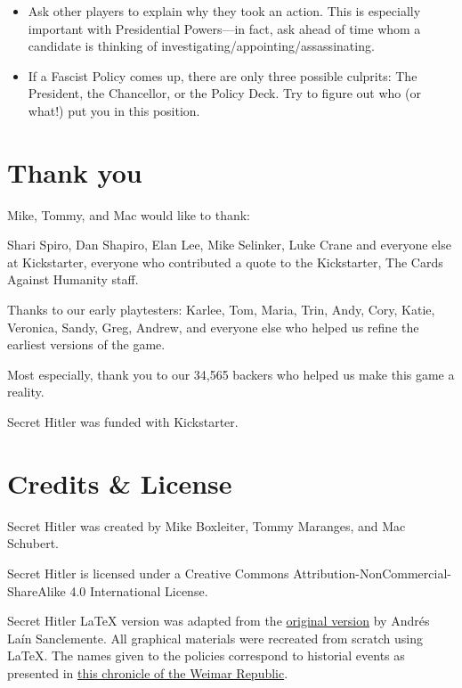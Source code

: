 \documentclass[13pt,a4paper,twocolumn,titlepage]{scrartcl}
\begin{document}
\begin{itemize}
		\item \textcolor{Blue3}{Ask other players to explain why they took an action.} This is especially important with Presidential Powers—in fact, ask ahead of time whom a candidate is thinking of investigating/appointing/assassinating.
		
		\item \textcolor{Blue3}{If a \textcolor{fascist}{Fascist} Policy comes up, there are only three possible culprits: The President, the Chancellor, or the Policy Deck.} Try to figure out who (or what!) put you in this position.
		
	\end{itemize}
	
	\section*{Thank you}
	\textcolor{Blue3}{Mike, Tommy, and Mac would like to thank:}
	
	Shari Spiro, Dan Shapiro, Elan Lee, Mike Selinker, Luke Crane and everyone else at Kickstarter, everyone who contributed a quote to the Kickstarter, The Cards Against Humanity staff.
	
	Thanks to our early playtesters: Karlee, Tom, Maria, Trin, Andy, Cory, Katie, Veronica, Sandy, Greg, Andrew, and everyone else who helped us refine the earliest versions of the game.
	
	Most especially, thank you to our 34,565 backers who helped us make this game a reality.
	
	\clearpage
	
	Secret Hitler was funded with \textcolor{Blue3}{Kickstarter}.
	\section*{Credits \& License}
	Secret Hitler was created by Mike Boxleiter, Tommy Maranges, and Mac Schubert.
	
	Secret Hitler is licensed under a Creative Commons Attribution-NonCommercial-ShareAlike 4.0 International License.
	
	Secret Hitler LaTeX version was adapted from the \hyperref{https://www.secrethitler.com/}{}{}{original version} by Andrés Laín Sanclemente. All graphical materials were recreated from scratch using LaTeX. The names given to the policies correspond to historial events as presented in \hyperref{https://www.weimarer-republik.net/themenportal/chronik-1918-bis-1933/1932/}{}{}{this chronicle of the Weimar Republic}.
	
\end{document}
